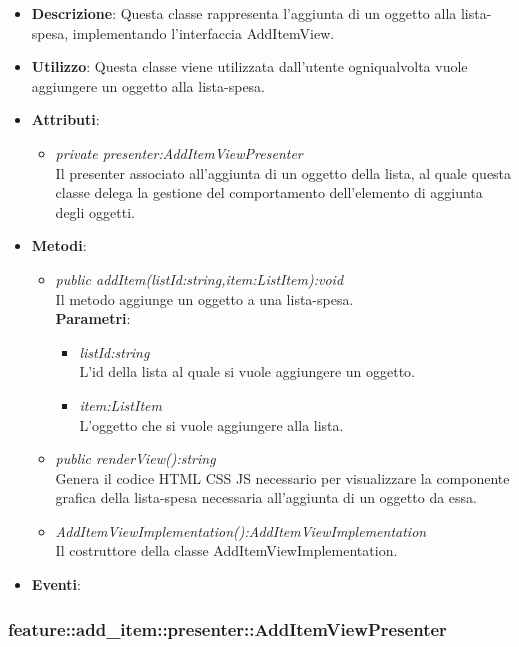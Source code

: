 \begin{itemize}
\item \textbf{Descrizione}: Questa classe rappresenta l'aggiunta di un oggetto alla lista-spesa, implementando l'interfaccia AddItemView.
\item \textbf{Utilizzo}: Questa classe viene utilizzata dall'utente ogniqualvolta vuole aggiungere un oggetto alla lista-spesa.
\item \textbf{Attributi}: 
	\begin{itemize}
	\item \textit{private presenter:AddItemViewPresenter}\\
	Il presenter associato all'aggiunta di un oggetto della lista, al quale questa classe delega la gestione del comportamento dell'elemento di aggiunta degli oggetti.
	\end{itemize}
\item \textbf{Metodi}:
	\begin{itemize}
	\item \textit{public addItem(listId:string,item:ListItem):void}\\
	Il metodo aggiunge un oggetto a una lista-spesa.
			\\ \textbf{Parametri}: \begin{itemize}
			\item \textit{listId:string}\\
			L'id della lista al quale si vuole aggiungere un oggetto.
			\item \textit{item:ListItem}\\
			L'oggetto che si vuole aggiungere alla lista.
			\end{itemize} 
	\item \textit{public renderView():string}\\
	Genera il codice HTML CSS JS necessario per visualizzare la componente grafica della lista-spesa necessaria all'aggiunta di un oggetto da essa.
	\item \textit{AddItemViewImplementation():AddItemViewImplementation}\\
	Il costruttore della classe AddItemViewImplementation.
	\end{itemize}
\item \textbf{Eventi}:
\end{itemize}

\subsubsection{feature::add\_item::presenter::AddItemViewPresenter}

